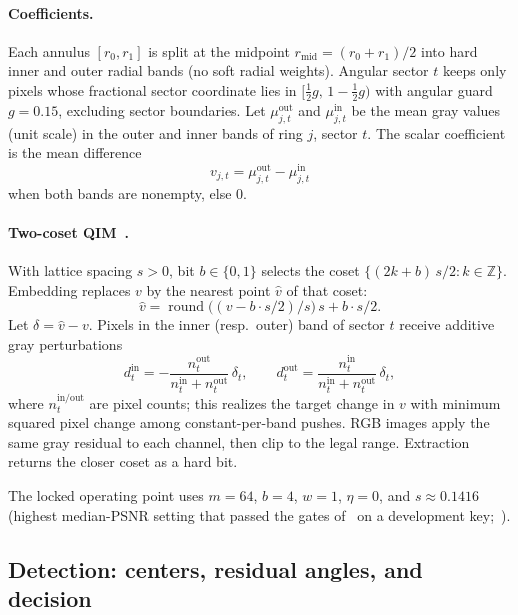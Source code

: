 \documentclass[11pt,a4paper]{article}
\begin{document}
\paragraph{Coefficients.}
Each annulus \([r_0,r_1]\) is split at the midpoint \(r_{\mathrm{mid}}=(r_0+r_1)/2\)
into hard inner and outer radial bands (no soft radial weights).
Angular sector \(t\) keeps only pixels whose fractional sector coordinate lies in
\([\tfrac{1}{2}g,\,1-\tfrac{1}{2}g)\) with angular guard \(g=0.15\), excluding
sector boundaries.
Let \(\mu^{\mathrm{out}}_{j,t}\) and \(\mu^{\mathrm{in}}_{j,t}\) be the mean gray
values (unit scale) in the outer and inner bands of ring \(j\), sector \(t\).
The scalar coefficient is the mean difference
\[
v_{j,t}=\mu^{\mathrm{out}}_{j,t}-\mu^{\mathrm{in}}_{j,t}
\]
when both bands are nonempty, else \(0\).

\paragraph{Two-coset QIM~\cite{chen2001qim}.}
With lattice spacing \(s>0\), bit \(b\in\{0,1\}\) selects the coset
\(\{(2k+b)\,s/2:k\in\mathbb{Z}\}\).
Embedding replaces \(v\) by the nearest point \(\widehat{v}\) of that coset:
\[
\widehat{v}
=\operatorname{round}\!\bigl((v-b\cdot s/2)/s\bigr)\,s+b\cdot s/2.
\]
Let \(\delta=\widehat{v}-v\).
Pixels in the inner (resp.\ outer) band of sector \(t\) receive additive gray
perturbations
\[
d^{\mathrm{in}}_t=-\frac{n^{\mathrm{out}}_t}{n^{\mathrm{in}}_t+n^{\mathrm{out}}_t}\,\delta_t,
\qquad
d^{\mathrm{out}}_t=\frac{n^{\mathrm{in}}_t}{n^{\mathrm{in}}_t+n^{\mathrm{out}}_t}\,\delta_t,
\]
where \(n^{\mathrm{in/out}}_t\) are pixel counts; this realizes the target change in
\(v\) with minimum squared pixel change among constant-per-band pushes.
RGB images apply the same gray residual to each channel, then clip to the legal
range.
Extraction returns the closer coset as a hard bit.

The locked operating point uses \(m=64\), \(b=4\), \(w=1\), \(\eta=0\), and
\(s\approx 0.1416\) (highest median-PSNR setting that passed the gates
of~ on a development key;~).

\subsection{Detection: centers, residual angles, and decision}
\label{sec:detect}
\end{document}
